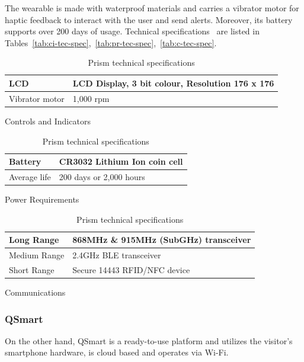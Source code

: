 The wearable is made with waterproof materials and carries a vibrator motor for haptic feedback to interact with the user and send alerts.
Moreover, its battery supports over 200 days of usage.
Technical specifications~\cite{prism-manual} are listed in Tables~\ref{tab:ci-tec-spec},~\ref{tab:pr-tec-spec},~\ref{tab:c-tec-spec}.

\begin{table}[H]
	\centering
	\begin{subtable}[t]{0.85\textwidth}
		\centering
		\begin{tabular}{|l|l|}
			\hline
			LCD            & LCD Display, 3 bit colour, Resolution 176 x 176 \\ \hline
			Vibrator motor & 1,000 rpm                                       \\
			\hline
		\end{tabular}
		\caption{Controls and Indicators}
		\label{tab:ci-tec-spec}
	\end{subtable}
	\begin{subtable}[t]{0.85\textwidth}
		\centering
		\begin{tabular}{|l|l|}
			\hline
			Battery      & CR3032 Lithium Ion coin cell \\ \hline
			Average life & 200 days or 2,000 hours      \\
			\hline
		\end{tabular}
		\caption{Power Requirements}
		\label{tab:pr-tec-spec}
	\end{subtable}
	\begin{subtable}[t]{0.85\textwidth}
		\centering
		\begin{tabular}{|l|l|}
			\hline
			Long Range   & 868MHz \& 915MHz (SubGHz) transceiver \\ \hline
			Medium Range & 2.4GHz BLE transceiver                \\ \hline
			Short Range  & Secure 14443 RFID/NFC device          \\
			\hline
		\end{tabular}
		\caption{Communications}
		\label{tab:c-tec-spec}
	\end{subtable}
	\caption{Prism technical specifications}
	\label{tab:prism-tech-spec}
\end{table}

\subsubsection*{QSmart}
On the other hand, QSmart is a ready-to-use platform and utilizes the visitor's smartphone hardware, is cloud based
and operates via Wi-Fi.

